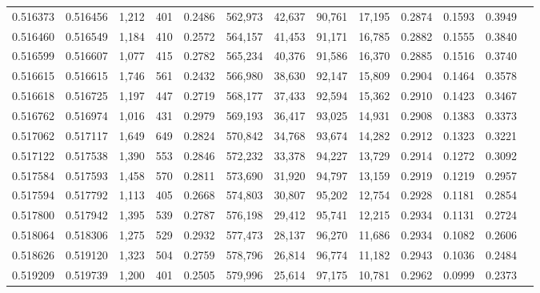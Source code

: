 \begin{tabular}{rrrrrrrrrrrrr}
0.516373 & 0.516456 & 1,212 &   401 &                                     0.2486 & 562,973 &  42,637 &  90,761 &  17,195 & 0.2874 & 0.1593 & 0.3949 \\
0.516460 & 0.516549 & 1,184 &   410 &                                     0.2572 & 564,157 &  41,453 &  91,171 &  16,785 & 0.2882 & 0.1555 & 0.3840 \\
0.516599 & 0.516607 & 1,077 &   415 &                                     0.2782 & 565,234 &  40,376 &  91,586 &  16,370 & 0.2885 & 0.1516 & 0.3740 \\
0.516615 & 0.516615 & 1,746 &   561 &                                     0.2432 & 566,980 &  38,630 &  92,147 &  15,809 & 0.2904 & 0.1464 & 0.3578 \\
0.516618 & 0.516725 & 1,197 &   447 &                                     0.2719 & 568,177 &  37,433 &  92,594 &  15,362 & 0.2910 & 0.1423 & 0.3467 \\
0.516762 & 0.516974 & 1,016 &   431 &                                     0.2979 & 569,193 &  36,417 &  93,025 &  14,931 & 0.2908 & 0.1383 & 0.3373 \\
0.517062 & 0.517117 & 1,649 &   649 &                                     0.2824 & 570,842 &  34,768 &  93,674 &  14,282 & 0.2912 & 0.1323 & 0.3221 \\
0.517122 & 0.517538 & 1,390 &   553 &                                     0.2846 & 572,232 &  33,378 &  94,227 &  13,729 & 0.2914 & 0.1272 & 0.3092 \\
0.517584 & 0.517593 & 1,458 &   570 &                                     0.2811 & 573,690 &  31,920 &  94,797 &  13,159 & 0.2919 & 0.1219 & 0.2957 \\
0.517594 & 0.517792 & 1,113 &   405 &                                     0.2668 & 574,803 &  30,807 &  95,202 &  12,754 & 0.2928 & 0.1181 & 0.2854 \\
0.517800 & 0.517942 & 1,395 &   539 &                                     0.2787 & 576,198 &  29,412 &  95,741 &  12,215 & 0.2934 & 0.1131 & 0.2724 \\
0.518064 & 0.518306 & 1,275 &   529 &                                     0.2932 & 577,473 &  28,137 &  96,270 &  11,686 & 0.2934 & 0.1082 & 0.2606 \\
0.518626 & 0.519120 & 1,323 &   504 &                                     0.2759 & 578,796 &  26,814 &  96,774 &  11,182 & 0.2943 & 0.1036 & 0.2484 \\
0.519209 & 0.519739 & 1,200 &   401 &                                     0.2505 & 579,996 &  25,614 &  97,175 &  10,781 & 0.2962 & 0.0999 & 0.2373 \\

\end{tabular}
